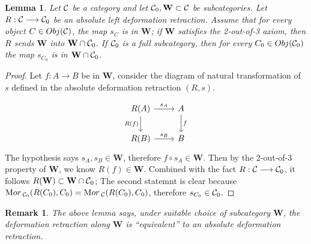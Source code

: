 \documentclass[11pt]{article}
\newtheorem{lemma}[thm]{Lemma}
\newtheorem{rmk}[thm]{Remark}
\newcommand{\mor}{{\text Mor\,}}
\newcommand{\calc}{{\cal C}}
\newcommand{\lrta}{\longrightarrow}
\begin{document}
\begin{lemma}
Let $\calc$ be a category and let $\calc_0, \mathbf{W}\subset \calc$ be subcategories. Let $R:\calc\lrta \calc_0$ be an absolute left deformation retraction. Assume that for every object $C\in Obj(\calc)$, the map $s_C$ is in $\mathbf{W}$; if $\mathbf{W}$ satisfies the 2-out-of-3 axiom, then $R$ sends $\mathbf{W}$ into $\mathbf{W}\cap \calc_0$. If $\calc_0$ is a full subcategory, then for every $C_0\in Obj(\calc_0)$ the map $s_{C_0}$ is in $\mathbf{W}\cap \calc_0$.
\end{lemma}
\begin{proof}
Let $f: A\lrta B$ be in $\mathbf{W}$, consider the diagram of natural transformation of $s$ defined in the absolute deformation retraction $(R,s)$.

$$
\begin{tikzcd}
R(A) \arrow[d, "R(f)"'] \arrow[r, "s_A"] & A \arrow[d, "f"] \\
R(B) \arrow[r, "s_B"] & B
\end{tikzcd}
$$
The hypothesis says $s_A, s_B\in \mathbf{W}$, therefore $f\circ  s_A\in \mathbf{W}$. Then by the 2-out-of-3 property of $\mathbf{W}$, we know $R(f)\in\mathbf{W}$. Combined with the fact $R: \calc\lrta \calc_0$, it follows $R(\mathbf{W})\subset \mathbf{W}\cap \calc_0$; The second statemnt is clear because $\mor_{\calc_0}(R(C_0), C_0)=\mor_{\calc}(R(C_0),C_0)$, therefore $s_{C_0}\in \calc_0$.  
\end{proof}
\begin{rmk}
The above lemma says, under suitable choice of subcategory $\mathbf{W}$, the deformation retraction along $\mathbf{W}$ is ``equivalent'' to an absolute deformation retraction. 
\end{rmk}
 
\end{document}
